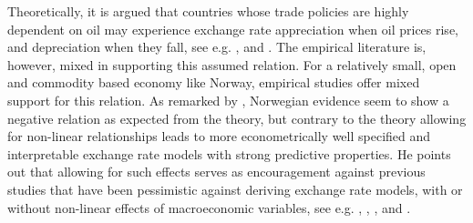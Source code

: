 \documentclass[10pt]{article}
\numberwithin{equation}{section}
\numberwithin{table}{section}
\numberwithin{figure}{section}
\begin{document}
\begin{spacing}{1.5}
\indent Theoretically, it is argued that countries whose trade policies are highly dependent on oil may experience exchange rate appreciation when oil prices rise, and depreciation when they fall, see e.g. \cite{krugman1980oil,krugman1983oil}, \cite{golub1983oil} and \cite{corden1984booming}. The empirical literature is, however, mixed in supporting this assumed relation. For a relatively small, open and commodity based economy like Norway, empirical studies offer mixed support for this relation. As remarked by \cite{akram2000does, akram2004oil}, Norwegian evidence seem to show a negative relation as expected from the theory, but contrary to the theory allowing for non-linear relationships leads to more econometrically well specified and interpretable exchange rate models with strong predictive properties. He points out that allowing for such effects serves as encouragement against previous studies that have been pessimistic against deriving exchange rate models, with or without non-linear effects of macroeconomic variables, see e.g. \cite{meese1983out,meese1983empirical}, \cite{meese1990currency}, \cite{meese1990nonlinear, meese1991empirical}, \cite{diebold1990nonparametric} and \cite{frenkel1995empirical}.\\

\end{spacing}
\end{document}
